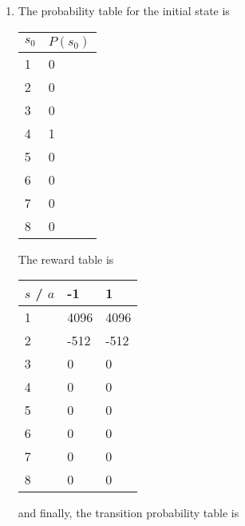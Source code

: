 \begin{solution}
    \begin{enumerate}
        \item The probability table for the initial state is 

\begin{tabular}{l|l}
$s_0$ & $P(s_0)$ \\ \hline
1    & 0       \\
2    & 0       \\
3    & 0       \\
4    & 1       \\
5    & 0       \\
6    & 0       \\
7    & 0       \\
8    & 0      
\end{tabular}

The reward table is

\begin{tabular}{l|ll}
$s$ / $a$ & -1   & 1    \\ \hline
1 & 4096 & 4096 \\
2 & -512 & -512 \\
3 & 0    & 0    \\
4 & 0    & 0    \\
5 & 0    & 0    \\
6 & 0    & 0    \\
7 & 0    & 0    \\
8 & 0    & 0
\end{tabular}

and finally, the transition probability table is 


\end{enumerate}
\end{solution}
